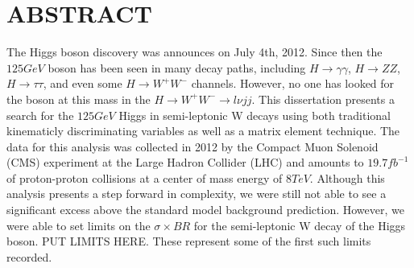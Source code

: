 %
%
%

\chapter*{ABSTRACT}

\pagestyle{plain} %
\setcounter{page}{2}

\indent The Higgs boson discovery was announces on July 4th, 2012. Since then the $125\unit{GeV}$ boson has been seen in many decay paths, including $H{\rightarrow}\gamma\gamma$, $H{\rightarrow}ZZ$, $H{\rightarrow}\tau\tau$, and even some $H{\rightarrow}W^{+}W^{-}$ channels. However, no one has looked for the boson at this mass in the $H{\rightarrow}W^{+}W^{-}{\rightarrow}l{\nu}jj$. This dissertation presents a search for the $125\unit{GeV}$ Higgs in semi-leptonic W decays using both traditional kinematicly discriminating variables as well as a matrix element technique. The data for this analysis was collected in 2012 by the Compact Muon Solenoid (CMS) experiment at the Large Hadron Collider (LHC) and amounts to $19.7\unit{fb^{-1}}$ of proton-proton collisions at a center of mass energy of $8\unit{TeV}$. Although this analysis presents a step forward in complexity, we were still not able to see a significant excess above the standard model background prediction. However, we were able to set limits on the $\sigma\times{BR}$ for the semi-leptonic W decay of the Higgs boson. PUT LIMITS HERE. These represent some of the first such limits recorded.


 

\pagebreak{}



